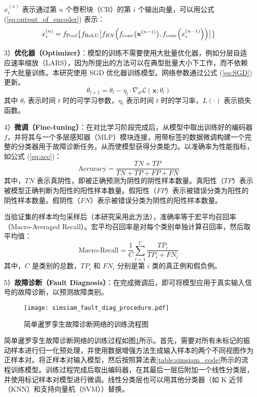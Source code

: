 \documentclass[master]{thesis-uestc}
\begin{document}
\( x_i^{(n)} \) 表示通过第 \( n \) 个卷积块（CB）的第 \( i \) 个输出向量，可以用公式 (\ref{eq:output_of_encoder}) 表示：
\begin{equation}
    \begin{aligned}
    x_i^{(n)} = f_{\text{Pool}}\bigl\{f_{\text{ReLU}}\bigl[f_{BN}\Bigl(f_{\text{conv}}\bigl(\mathbf{x}^{(n-1)}\bigr), f_{\text{conv}}\Bigl(x_i^{(n-1)}\Bigr)\Bigr)\bigr]\bigr\}
    \end{aligned}
    \label{eq:output_of_encoder}
\end{equation}

3）\textbf{优化器（Optimizer）}：模型的训练不需要使用大批量优化器，例如分层自适应速率缩放（LARS），因为所提出的方法可以在典型批量大小下工作，而不依赖于大批量训练。本研究使用 SGD 优化器训练模型。网络参数通过公式 (\ref{eq:SGD}) 更新。
\begin{equation}
    \theta_{l+1} = \theta_l - \eta_l \cdot \nabla_{\theta} \mathcal{L}(\mathbf{x}; \theta_l)
\label{eq:SGD}
\end{equation}
其中 \( \theta_t \) 表示时间 \( t \) 时的可学习参数，\( \eta_t \) 表示时间 \( t \) 时的学习率，\( L(\cdot) \) 表示损失函数。

4）\textbf{微调（Fine-tuning）}：在对比学习阶段完成后，从模型中取出训练好的编码器 \( f \)，并将其与一个多层感知器（MLP）模块连接，用带标签的数据微调构建一个完整的分类器用于故障诊断任务，从而使模型获得分类能力。以准确率为性能指标，如公式 (\ref{eq:acc})：
\begin{equation}
    \text{Accuracy} = \frac{TN + TP}{TN + TP + FP + FN}
    \label{eq:acc}
\end{equation}
其中，\( TN \) 表示真阴性，即被正确预测为阴性的阴性样本数量。真阳性（\( TP \)）表示被模型正确判断为阳性的阳性样本数量。假阳性（\( FP \)）表示被错误分类为阳性的阴性样本数量。假阴性（\( FN \)）表示被错误分类为阴性的阳性样本数量。  

当验证集的样本均匀采样后（本研究采用此方法），准确率等于宏平均召回率（Macro-Averaged Recall）。宏平均召回率是对每个类别单独计算召回率，然后取平均值：
\begin{equation}
    \text{Macro-Recall} = \frac{1}{C} \sum_{i=1}^{C} \frac{TP_i}{TP_i + FN_i}
    \label{eq:macro_recall}
\end{equation}
其中，\( C \) 是类别的总数，\( TP_i \) 和 \( FN_i \) 分别是第 \( i \) 类的真正例和假负例。




5）\textbf{故障诊断（Fault Diagnosis）}：在完成微调后，即可将模型应用于真实输入信号的故障诊断，以预测故障类别。
\begin{figure}[h]
    \centering
    \texttt{[image: simsiam\_fault\_diag\_procedure.pdf]}
    \caption{简单暹罗孪生故障诊断网络的训练流程图}
    \label{simsiam_fault_diag_procedure}
\end{figure}
简单暹罗孪生故障诊断网络的训练过程如图\ref{simsiam_fault_diag_procedure}所示。首先，需要对所有未标记的振动样本进行归一化预处理，并使用数据增强方法生成输入样本的两个不同视图作为正样本对。将正样本对输入模型，然后按照算法表\ref{table:simsiam_code}所示的流程训练模型。训练过程完成后取出编码器，在其最后一层后附加一个线性分类层，并使用标记样本对模型进行微调。线性分类层也可以用其他分类器（如 K 近邻（KNN）和支持向量机（SVM））替换。
\end{document}
